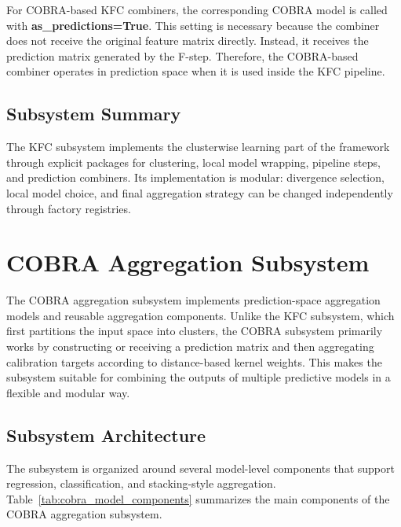 For COBRA-based KFC combiners, the corresponding COBRA model is called with \textbf{as\_predictions=True}. This setting is necessary because the combiner does not receive the original feature matrix directly. Instead, it receives the prediction matrix generated by the F-step. Therefore, the COBRA-based combiner operates in prediction space when it is used inside the KFC pipeline.

\subsection{Subsystem Summary}

\hs The KFC subsystem implements the clusterwise learning part of the framework through explicit packages for clustering, local model wrapping, pipeline steps, and prediction combiners. Its implementation is modular: divergence selection, local model choice, and final aggregation strategy can be changed independently through factory registries.


\section{COBRA Aggregation Subsystem}
\label{sec:cobra_subsystem}

\hs The COBRA aggregation subsystem implements prediction-space aggregation models and reusable aggregation components. Unlike the KFC subsystem, which first partitions the input space into clusters, the COBRA subsystem primarily works by constructing or receiving a prediction matrix and then aggregating calibration targets according to distance-based kernel weights. This makes the subsystem suitable for combining the outputs of multiple predictive models in a flexible and modular way.

\subsection{Subsystem Architecture}

\hs The subsystem is organized around several model-level components that support regression, classification, and stacking-style aggregation. Table~\ref{tab:cobra_model_components} summarizes the main components of the COBRA aggregation subsystem.

